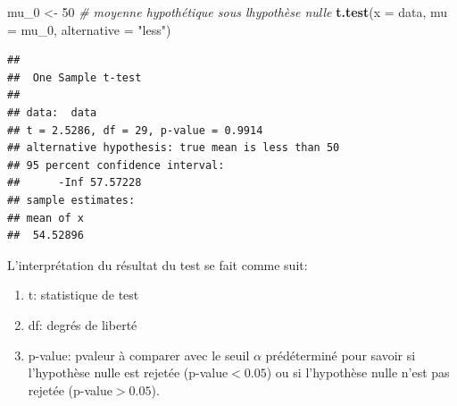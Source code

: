 \documentclass[
]{book}
\newenvironment{Shaded}{\begin{snugshade}}{\end{snugshade}}
\newcommand{\AttributeTok}[1]{\textcolor[rgb]{0.13,0.29,0.53}{#1}}
\newcommand{\CommentTok}[1]{\textcolor[rgb]{0.56,0.35,0.01}{\textit{#1}}}
\newcommand{\DecValTok}[1]{\textcolor[rgb]{0.00,0.00,0.81}{#1}}
\newcommand{\FunctionTok}[1]{\textcolor[rgb]{0.13,0.29,0.53}{\textbf{#1}}}
\newcommand{\NormalTok}[1]{#1}
\newcommand{\OtherTok}[1]{\textcolor[rgb]{0.56,0.35,0.01}{#1}}
\newcommand{\StringTok}[1]{\textcolor[rgb]{0.31,0.60,0.02}{#1}}
\providecommand{\tightlist}{%
  \setlength{\itemsep}{0pt}\setlength{\parskip}{0pt}}
\begin{document}
\begin{Shaded}
\begin{Highlighting}[]
\NormalTok{mu\_0 }\OtherTok{\textless{}{-}} \DecValTok{50}  \CommentTok{\# moyenne hypothétique sous l\textquotesingle{}hypothèse nulle }
\FunctionTok{t.test}\NormalTok{(}\AttributeTok{x =}\NormalTok{ data, }\AttributeTok{mu =}\NormalTok{ mu\_0, }\AttributeTok{alternative =} \StringTok{"less"}\NormalTok{)}
\end{Highlighting}
\end{Shaded}

\begin{verbatim}
## 
##  One Sample t-test
## 
## data:  data
## t = 2.5286, df = 29, p-value = 0.9914
## alternative hypothesis: true mean is less than 50
## 95 percent confidence interval:
##      -Inf 57.57228
## sample estimates:
## mean of x 
##  54.52896
\end{verbatim}

L'interprétation du résultat du test se fait comme suit:

\begin{enumerate}
\def\labelenumi{\arabic{enumi}.}
\tightlist
\item
  t: statistique de test
\item
  df: degrés de liberté
\item
  p-value: pvaleur à comparer avec le seuil \(\alpha\) prédéterminé pour savoir si l'hypothèse nulle est rejetée (p-value\(<0.05\)) ou si l'hypothèse nulle n'est pas rejetée (p-value\(>0.05\)).
\end{enumerate}

  
\end{document}
